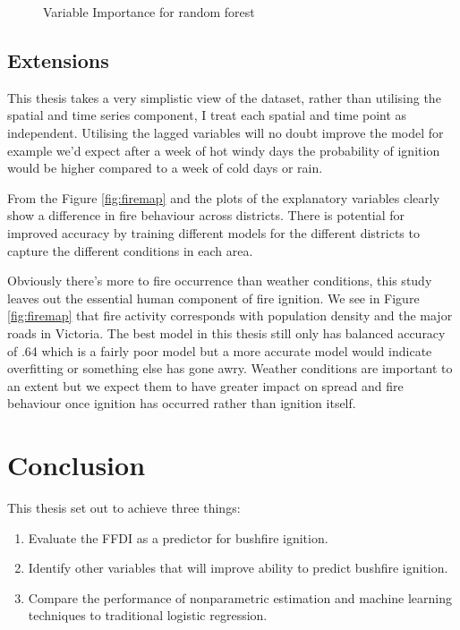 \documentclass[11pt,a4paper]{article}
\begin{document}
\begin{figure}[!ht]
	\centering 
	\caption{Variable Importance for random forest} 
	\label{fig:rocrf} 
\end{figure}

\subsection{Extensions}

This thesis takes a very simplistic view of the dataset, rather than utilising the spatial and time series component, I treat each spatial and time point as independent. Utilising the lagged variables will no doubt improve the model for example we'd expect after a week of hot windy days the probability of ignition would be higher compared to a week of cold days or rain. 

From the Figure \ref{fig:firemap} and the plots of the explanatory variables clearly show a difference in fire behaviour across districts. There is potential for improved accuracy by training different models for the different districts to capture the different conditions in each area. 

Obviously there's more to fire occurrence than weather conditions, this study leaves out the essential human component of fire ignition. We see in Figure \ref{fig:firemap} that fire activity corresponds with population density and the major roads in Victoria. The best model in this thesis still only has balanced accuracy of .64 which is a fairly poor model but a more accurate model would indicate overfitting or something else has gone awry.  Weather conditions are important to an extent but we expect them to have greater impact on spread and fire behaviour once ignition has occurred rather than ignition itself. 


\section{Conclusion}

This thesis set out to achieve three things:
\begin{enumerate}
\item Evaluate the FFDI as a predictor for bushfire ignition.
\item Identify other variables that will improve ability to predict bushfire ignition.
\item Compare the performance of nonparametric estimation and machine learning techniques to traditional logistic regression.
\end{enumerate}
\end{document}
